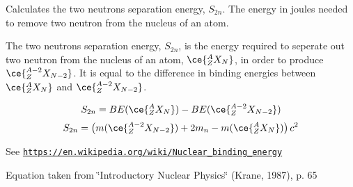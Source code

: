 Calculates the two neutrons separation energy, $S_{2n}$. The energy in joules needed to remove two neutron from the nucleus of an atom. 

The two neutrons separation energy, $S_{2n}$, is the energy required to seperate out two neutron from the nucleus of an atom, $\ce{ ^{A}_{Z}X_{N} }$, in order to produce $\ce{ ^{A-2}_{Z}X_{N-2} }$. It is equal to the difference in binding energies between $\ce{ ^{A}_{Z}X_{N} }$ and $\ce{ ^{A-2}_{Z}X_{N-2} }$.

\[S_{2n} = BE(\ce{ ^{A}_{Z}X_{N} }) - BE(\ce{ ^{A-2}_{Z}X_{N-2} })\] \[S_{2n} = \left ( m(\ce{ ^{A-2}_{Z}X_{N-2} }) + 2 m_n - m(\ce{ ^{A}_{Z}X_{N} }) \right ) c^2\]

See \href{https://en.wikipedia.org/wiki/Nuclear_binding_energy}{\tt https\+://en.\+wikipedia.\+org/wiki/\+Nuclear\+\_\+binding\+\_\+energy}

Equation taken from \char`\"{}\+Introductory Nuclear Physics\char`\"{} (Krane, 1987), p. 65


